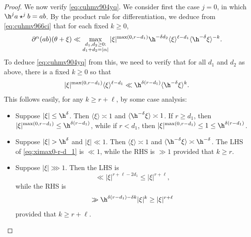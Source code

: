\begin{proof}
  We now verify \eqref{eq:cuhmv904yq}.  We consider first the case $j = 0$, in which $\h^j a \star^j b = a b$.  By the product rule for differentiation, we deduce from \eqref{eq:cuhmv966ci} that for each fixed $k \geq 0$,
  \begin{equation*}
    \partial^\alpha (a b)(\theta + \xi) \ll
    \max_{
      \substack{
        d_1, d_2 \geq 0:   \\
        d_1 + d_2 = |\alpha|
      }
    }
    |\xi|^{\max(0,r - d_1)}
    \h^{- \delta d_2}
    \langle \xi  \rangle^{\ell - d_1}
    \langle \h^{-\delta} \xi  \rangle^{-k}.
  \end{equation*}
  To deduce \eqref{eq:cuhmv904yq} from this, we need to verify that for all $d_1$ and $d_2$ as above, there is a fixed $k \geq 0$ so that
  \begin{equation}\label{eq:ximax0-r-d_1}
    |\xi|^{\max(0,r - d_1)}
    \langle \xi  \rangle^{\ell - d_1}
    \ll
    \h^{\delta (r - d_1)}
    \langle \h^{- \delta} \xi  \rangle^k.
  \end{equation}
  This follows easily, for any $k \geq r + \ell$, by some case analysis:
  \begin{itemize}
  \item Suppose $|\xi| \leq \h^\delta$.  Then $\langle \xi \rangle \asymp 1$ and $\langle \h^{-\delta} \xi \rangle \asymp 1$.  If $r \geq d_1$, then $|\xi|^{\max(0,r - d_1)} \leq \h^{\delta (r - d_1)}$, while if $r < d_1$, then $|\xi|^{\max(0, r - d_1)} \leq 1 \leq \h^{\delta(r-d_1)}$.
  \item Suppose $|\xi| > \h^\delta$ and $|\xi| \ll 1$.  Then $\langle \xi \rangle \asymp 1$ and $\langle \h^{-\delta} \xi \rangle \asymp \h^{-\delta}$.  The LHS of \eqref{eq:ximax0-r-d_1} is $\ll 1$, while the RHS is $\gg 1$ provided that $k \geq r$.
  \item Suppose $|\xi| \ggg 1$.  Then the LHS is
    \begin{equation*}
      \ll |\xi|^{r + \ell - 2 d_1} \leq |\xi|^{r + \ell},
    \end{equation*}
    while the RHS is
    \begin{equation*}
      \gg \h^{\delta (r - d_1) - \delta k} |\xi|^k
      \geq |\xi|^{r+\ell}
    \end{equation*}
    provided that $k \geq r + \ell$.
  \end{itemize}


\end{proof}
